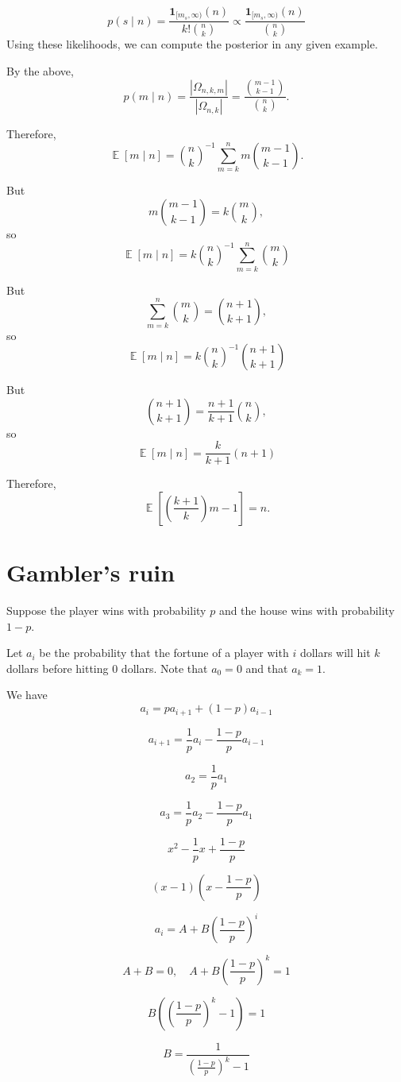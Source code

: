 \documentclass{amsart}
\DeclareMathOperator{\Exp}{\mathbb{E}}
\begin{document}
\[
p(s\mid n) =
\frac{\mathbf{1}_{[m_s,\infty)}(n)}{\displaystyle k!\binom{n}{k}}
\propto \frac{\mathbf{1}_{[m_s,\infty)}(n)}{\displaystyle \binom{n}{k}}
\]
Using these likelihoods, we can compute the posterior in any given example.

By the above,
\[
p(m\mid n) = \frac{|\Omega_{n, k, m}|}{|\Omega_{n, k}|}
= \frac{\displaystyle\binom{m - 1}{k - 1}}{\displaystyle\binom{n}{k}}.
\]

Therefore,
\[
\Exp[m\mid n] = \binom{n}{k}^{-1}\sum_{m=k}^n m\binom{m - 1}{k - 1}.
\]

But
\[
m\binom{m - 1}{k - 1} = k\binom{m}{k},
\]
so
\[
\Exp[m\mid n] =
k\binom{n}{k}^{-1}\sum_{m=k}^n\binom{m}{k}
\]

But
\[
\sum_{m=k}^n\binom{m}{k} = \binom{n + 1}{k + 1},
\]
so
\[
\Exp[m\mid n] = k\binom{n}{k}^{-1}\binom{n + 1}{k + 1}
\]

But
\[
\binom{n + 1}{k + 1} = \frac{n + 1}{k + 1}\binom{n}{k},
\]
so
\[
\Exp[m\mid n] = \frac{k}{k + 1}(n + 1)
\]

Therefore,
\[
\Exp\left[\left(\frac{k + 1}{k}\right)m - 1\right] = n.
\]

\section{Gambler's ruin}

Suppose the player wins with probability $p$ and the house wins with probability $1 - p$.

Let $a_i$ be the probability that the fortune of a player with $i$ dollars will hit $k$ dollars before hitting $0$ dollars.
Note that $a_0=0$ and that $a_k=1$.

We have
\[
a_i = pa_{i + 1} + (1-p)a_{i - 1}
\]

\[
a_{i + 1} = \frac1p a_i - \frac{1 - p}{p}a_{i - 1}
\]

\[
a_2 = \frac1p a_1
\]

\[
a_3 = \frac1p a_2 - \frac{1 - p}p a_1
\]

\[
x^2 - \frac1p x + \frac{1 - p}p
\]

\[
(x - 1)\left(x - \frac{1 - p}{p}\right)
\]

\[
a_i = A + B\left(\frac{1 - p}{p}\right)^i
\]

\[
A + B = 0,\quad
A + B\left(\frac{1 - p}{p}\right)^k = 1
\]

\[
B\left(\left(\frac{1 - p}{p}\right)^k - 1\right) = 1
\]

\[
B = \frac1{\left(\frac{1 - p}{p}\right)^k - 1}
\]
\end{document}
